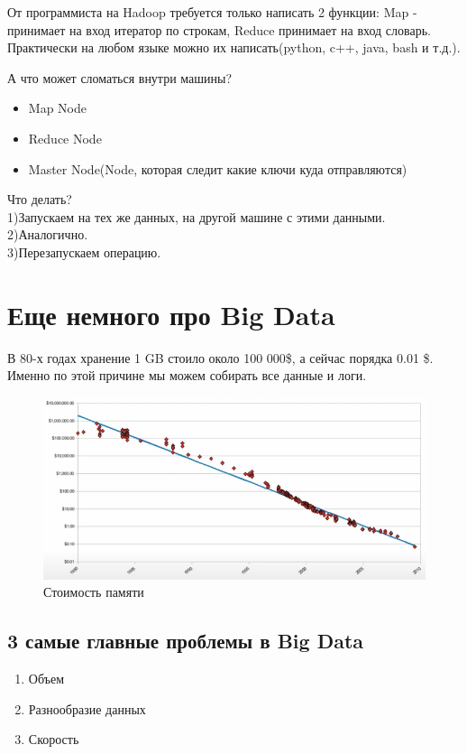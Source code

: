 \documentclass{article}
\begin{document}
\noindent От программиста на Hadoop требуется только написать 2 функции: Map - принимает на вход итератор по строкам, Reduce принимает на вход словарь. Практически на любом языке можно их написать(python, c++, java, bash и  т.д.).

\noindent А что может сломаться внутри машины?
\begin{itemize}
    \item Map Node 
    \item Reduce Node
    \item Master Node(Node, которая следит какие ключи куда отправляются)
\end{itemize}

\noindent Что делать?\\
1)Запускаем на тех же данных, на другой машине с этими данными.\\
2)Аналогично.\\
3)Перезапускаем операцию.

\section{Еще немного про Big Data}

В 80-х годах хранение 1 GB стоило около 100 000\$, а сейчас порядка 0.01 \$. Именно по этой причине мы можем собирать все данные и логи.

\begin{figure}[h]
\centering
\includegraphics[width=1\textwidth]{why.png}
\caption{Стоимость памяти}
\end{figure}

\subsection{3 самые главные проблемы в Big Data}

\begin{enumerate}
    \item Объем
    \item Разнообразие данных
    \item Скорость
\end{enumerate}
\end{document}
